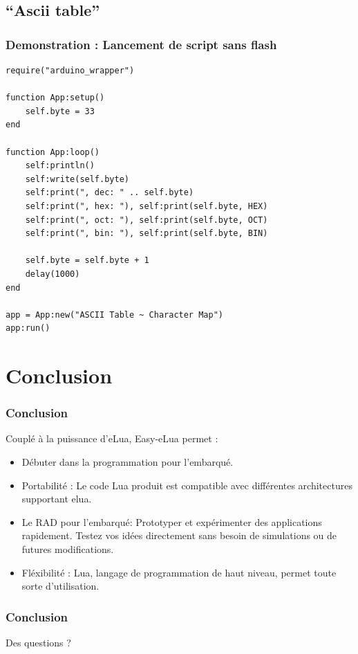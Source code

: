 \documentclass{beamer}
\begin{document}
\subsection{``Ascii table''}
\begin{frame}[containsverbatim]
\frametitle{Demonstration : Lancement de script sans flash}
\tiny{\begin{lstlisting}
require("arduino_wrapper")

function App:setup()
    self.byte = 33
end

function App:loop()
    self:println()
    self:write(self.byte)
    self:print(", dec: " .. self.byte)
    self:print(", hex: "), self:print(self.byte, HEX)
    self:print(", oct: "), self:print(self.byte, OCT)
    self:print(", bin: "), self:print(self.byte, BIN)

    self.byte = self.byte + 1
    delay(1000)
end

app = App:new("ASCII Table ~ Character Map")
app:run()

\end{lstlisting}}
\end{frame}

\section{Conclusion}
\begin{frame}
\frametitle{Conclusion}
Couplé à la puissance d'eLua, Easy-eLua permet :
\begin{itemize}
\item Débuter dans la programmation pour l'embarqué.
\item Portabilité : Le code Lua produit est compatible avec différentes architectures supportant elua.
\item Le RAD pour l'embarqué: Prototyper et expérimenter des applications rapidement. Testez vos idées directement sans besoin de simulations ou de futures modifications.
\item Fléxibilité : Lua, langage de programmation de haut niveau, permet toute sorte d'utilisation.
\end{itemize}
\end{frame}

\begin{frame}
\frametitle{Conclusion}
\begin{center}
\huge{Des questions ?}
\end{center}
\end{frame}
\end{document}
